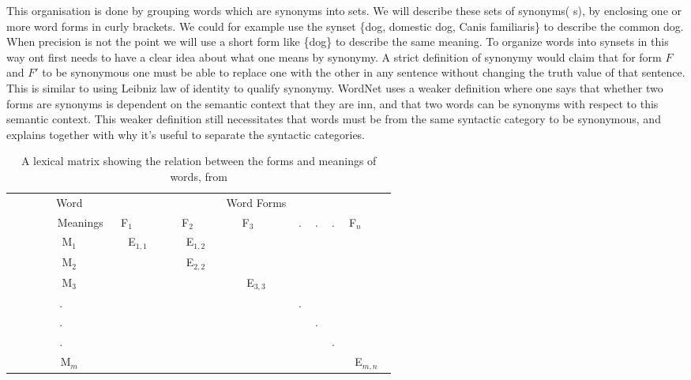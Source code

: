 This organisation is done by grouping words which are synonyms into sets.
We will describe these sets of synonyms( s), by enclosing one or more word forms in curly brackets.
We could for example use the synset \{dog, domestic dog, Canis familiaris\} to describe the common dog.
When precision is not the point we will use a short form like \{dog\} to describe the same meaning.
To organize words into synsets in this way ont first needs to have a clear idea about what one means by synonymy.
A strict definition of synonymy would claim that for form $F$ and $F'$ to be synonymous one must be able
to replace one with the other in any sentence without changing the truth value of that sentence.
This is similar to using Leibniz law of identity to qualify synonymy.
WordNet uses a weaker definition where one says that whether two forms are synonyms is dependent on the
semantic context that they are inn, and that two words can be synonyms with respect to this semantic context\citep{Miller1990}.
This weaker definition still necessitates that words must be from the same syntactic category to be synonymous,
and explains together with \citet{Fillenbaum1965} why it's useful to separate the syntactic categories.

\begin{table}[ht]
	\centering
	\begin{tabular}{|c||ccccccc|}
		\hline
	        Word     & 	~		 & ~		 & Word Forms & ~ & ~ & ~ & ~		  \\
	        Meanings & F$_1$     & F$_2$     & F$_3$      & . & . & . & F$_n$     \\ \hline
	        M$_1$    & E$_{1,1}$ & E$_{1,2}$ & ~          & ~ & ~ & ~ & ~         \\
	        M$_2$    & ~         & E$_{2,2}$ & ~          & ~ & ~ & ~ & ~         \\
	        M$_3$    & ~         & ~         & E$_{3,3}$  & ~ & ~ & ~ & ~         \\
	        .        & ~         & ~         & ~          & . & ~ & ~ & ~         \\
	        .        & ~         & ~         & ~          & ~ & . & ~ & ~         \\
	        .        & ~         & ~         & ~          & ~ & ~ & . & ~         \\
	        M$_m$    & ~         & ~         & ~          & ~ & ~ & ~ & E$_{m,n}$ \\
		\hline
	\end{tabular}
	\caption{A lexical matrix showing the relation between the forms and meanings of words, from \citet{Miller1990}}
	\label{table:LexicalMatrix}
\end{table}

